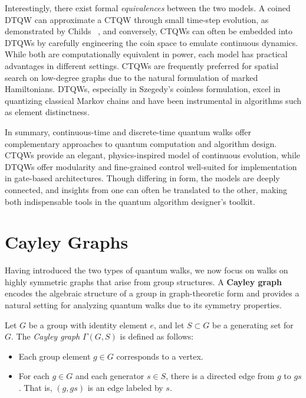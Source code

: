 \documentclass[12pt]{report}
\begin{document}
Interestingly, there exist formal \textit{equivalences} between the two models. A coined DTQW can approximate a CTQW through small time-step evolution, as demonstrated by Childs ~\cite{childs2010relationship}, and conversely, CTQWs can often be embedded into DTQWs by carefully engineering the coin space to emulate continuous dynamics. While both are computationally equivalent in power, each model has practical advantages in different settings. CTQWs are frequently preferred for spatial search on low-degree graphs due to the natural formulation of marked Hamiltonians. DTQWs, especially in Szegedy’s coinless formulation, excel in quantizing classical Markov chains and have been instrumental in algorithms such as element distinctness.

In summary, continuous-time and discrete-time quantum walks offer complementary approaches to quantum computation and algorithm design. CTQWs provide an elegant, physics-inspired model of continuous evolution, while DTQWs offer modularity and fine-grained control well-suited for implementation in gate-based architectures. Though differing in form, the models are deeply connected, and insights from one can often be translated to the other, making both indispensable tools in the quantum algorithm designer’s toolkit.






\section{Cayley Graphs}



Having introduced the two types of quantum walks, we now focus on walks on highly symmetric graphs that arise from group structures. A \textbf{Cayley graph} encodes the algebraic structure of a group in graph-theoretic form and provides a natural setting for analyzing quantum walks due to its symmetry properties.

Let $G$ be a group with identity element $e$, and let $S \subset G$ be a generating set for $G$. The \emph{Cayley graph} $\Gamma(G,S)$ is defined as follows:
\begin{itemize}
    \item Each group element $g \in G$ corresponds to a vertex.
    \item For each $g \in G$ and each generator $s \in S$, there is a directed edge from $g$ to $gs$. That is, $(g, gs)$ is an edge labeled by $s$.
\end{itemize}
\end{document}
